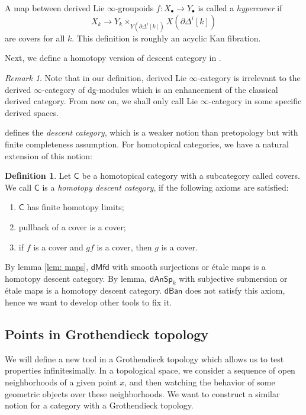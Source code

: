 \documentclass[12pt]{amsart}
\theoremstyle{definition}
\newtheorem{defn}[thm]{Definition}
\theoremstyle{remark}
\newtheorem{rem}[thm]{Remark}
\numberwithin{equation}{section}
\newcommand{\del}{\partial}
\renewcommand{\del}{\partial}
\newcommand{\CC}{{\mathsf C}}
\newcommand{\1}{{\mathbb{1}}}
\newcommand{\dmfd}{\mathsf{dMfd}}
\newcommand{\dan}{\mathsf{dAnSp}}
\newcommand{\dban}{\mathsf{dBan}}
\begin{document}
A map between derived Lie $\infty$-groupoids $f: X_{\bullet} \to Y_{\bullet}$ is called a {\it hypercover} if 
$$X_k \to Y_k \times_{Y(\del \Delta^i[k])} X(\del \Delta^i[k]) $$
are covers for all $k$. This definition is roughly an acyclic Kan fibration.

Next, we define a homotopy version of descent category in \cite{BG17}.

\begin{rem}%
    Note that in our definition, derived Lie $\infty$-category is irrelevant to the derived $\infty$-category of dg-modules which is an enhancement of the classical derived category. From now on, we shall only call Lie $\infty$-category in some specific derived spaces.
\end{rem}

\cite{BG17} defines the {\it descent category}, which is a weaker notion than pretopology but with finite completeness assumption. For homotopical categories, we have a natural extension of this notion:

\begin{defn}%
	Let $\CC$ be a homotopical  category with a subcategory called covers.  We call $\CC$ is a {\it homotopy descent category}, if the following axioms are satisfied:
	\begin{enumerate}
	    \item $\CC$ has finite homotopy limits;
	    \item pullback of a cover is a cover;
	    \item if $f$ is a cover and $gf$ is a cover, then $g$ is a cover.
	\end{enumerate}
\end{defn}

 By lemma \ref{lem: maps}, $\dmfd$ with smooth surjections or {\'e}tale maps  is a homotopy descent category. By lemma, $\dan_k$ with  subjective submersion or {\'e}tale maps is a homotopy descent category. $\dban$ does not satisfy this axiom, hence we want to develop other tools to fix it. 





\subsection{Points in Grothendieck topology} 
We will define a new tool in a Grothendieck topology which allows us to test properties infinitesimally. In a topological space, we consider a sequence of open neighborhoods of a given point $x$, and then watching the behavior of some geometric objects over these neighborhoods. We want to construct a similar notion for a category with a Grothendieck topology.
\end{document}

